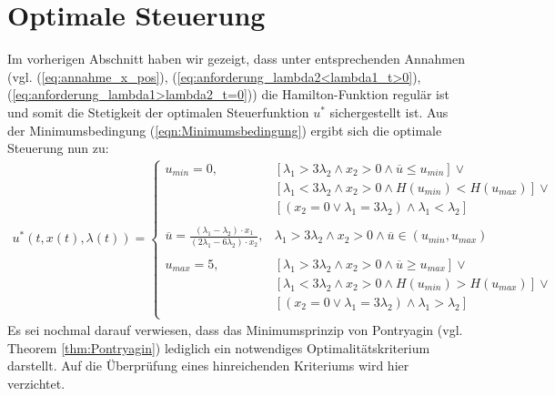 \section{Optimale Steuerung}
Im vorherigen Abschnitt haben wir gezeigt, dass unter entsprechenden Annahmen (vgl. (\ref{eq:annahme_x_pos}), (\ref{eq:anforderung_lambda2<lambda1_t>0}), (\ref{eq:anforderung_lambda1>lambda2_t=0})) die Hamilton-Funktion regulär ist und somit die Stetigkeit der optimalen Steuerfunktion $u^*$ sichergestellt ist. Aus der Minimumsbedingung (\ref{eqn:Minimumsbedingung}) ergibt sich die optimale Steuerung nun zu:
\begin{align}\label{eq:OptSteu}
	u^*(t,x(t),\lambda(t)) = \begin{cases}
	u_{min} = 0, 
		& [\lambda_1 > 3\lambda_2 \land x_2>0 \land \overline{u} \leq u_{min}] \lor \\
		& [\lambda_1 < 3\lambda_2 \land x_2 > 0 \land H(u_{min}) < H(u_{max})] \lor \\
		& [(x_2 = 0 \lor \lambda_1 = 3\lambda_2) \land \lambda_1 < \lambda_2]\\
		& \\
	\overline{u} = \frac{(\lambda_1-\lambda_2) \cdot  x_1}{(2 \lambda_1 -  6 \lambda_2) \cdot  x_2}, 
		& \lambda_1 > 3\lambda_2 \land x_2>0 \land \overline{u} \in (u_{min},u_{max}) \\
		& \\
	u_{max} = 5, 
		& [\lambda_1 > 3\lambda_2 \land x_2>0 \land \overline{u} \geq u_{max}] \lor\\
		& [\lambda_1 < 3\lambda_2 \land x_2 > 0 \land H(u_{min}) > H(u_{max})]  \lor\\
		& [(x_2 = 0 \lor \lambda_1 = 3\lambda_2) \land \lambda_1 > \lambda_2] \\
	\end{cases}
\end{align}
Es sei nochmal darauf verwiesen, dass das Minimumsprinzip von Pontryagin (vgl. Theorem \ref{thm:Pontryagin}) lediglich ein notwendiges Optimalitätskriterium darstellt. Auf die Überprüfung eines hinreichenden Kriteriums wird hier verzichtet. 

